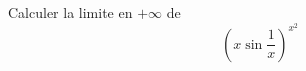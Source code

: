 Calculer la limite en $+\infty$ de
\begin{displaymath}
 \left( x\sin \frac{1}{x}\right)^{x^2} 
\end{displaymath}
\bigskip 

